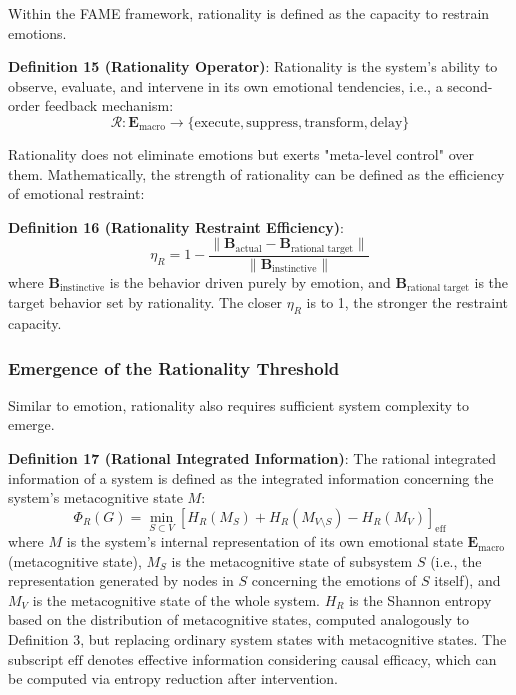 \documentclass[12pt,a4paper]{article}
\theoremstyle{plain}
\newcommand{\ve}[1]{\bm{#1}}                    %
\newcommand{\Evec}{\ve{E}}                        %
\newcommand{\Bvec}{\ve{B}}                        %
\begin{document}
Within the FAME framework, rationality is defined as the capacity to restrain emotions.

\textbf{Definition 15 (Rationality Operator)}: Rationality is the system's ability to observe, evaluate, and intervene in its own emotional tendencies, i.e., a second-order feedback mechanism:
\begin{equation}
\mathcal{R}: \Evec_{\text{macro}} \to \{\text{execute}, \text{suppress}, \text{transform}, \text{delay}\}
\label{eq:rational_operator}
\end{equation}

Rationality does not eliminate emotions but exerts "meta-level control" over them. Mathematically, the strength of rationality can be defined as the efficiency of emotional restraint:

\textbf{Definition 16 (Rationality Restraint Efficiency)}:
\begin{equation}
\eta_R = 1 - \frac{\|\Bvec_{\text{actual}} - \Bvec_{\text{rational target}}\|}{\|\Bvec_{\text{instinctive}}\|}
\label{eq:eta_R}
\end{equation}
where $\Bvec_{\text{instinctive}}$ is the behavior driven purely by emotion, and $\Bvec_{\text{rational target}}$ is the target behavior set by rationality. The closer $\eta_R$ is to 1, the stronger the restraint capacity.

\subsubsection{Emergence of the Rationality Threshold}

Similar to emotion, rationality also requires sufficient system complexity to emerge.

\textbf{Definition 17 (Rational Integrated Information)}: The rational integrated information of a system is defined as the integrated information concerning the system's metacognitive state $M$:
\begin{equation}
\Phi_R(G) = \min_{S \subset V} \left[ H_R(M_S) + H_R(M_{V \setminus S}) - H_R(M_V) \right]_{\text{eff}}
\label{eq:Phi_R}
\end{equation}
where $M$ is the system's internal representation of its own emotional state $\Evec_{\text{macro}}$ (metacognitive state), $M_S$ is the metacognitive state of subsystem $S$ (i.e., the representation generated by nodes in $S$ concerning the emotions of $S$ itself), and $M_V$ is the metacognitive state of the whole system. $H_R$ is the Shannon entropy based on the distribution of metacognitive states, computed analogously to Definition 3, but replacing ordinary system states with metacognitive states. The subscript $\text{eff}$ denotes effective information considering causal efficacy, which can be computed via entropy reduction after intervention.
\end{document}
